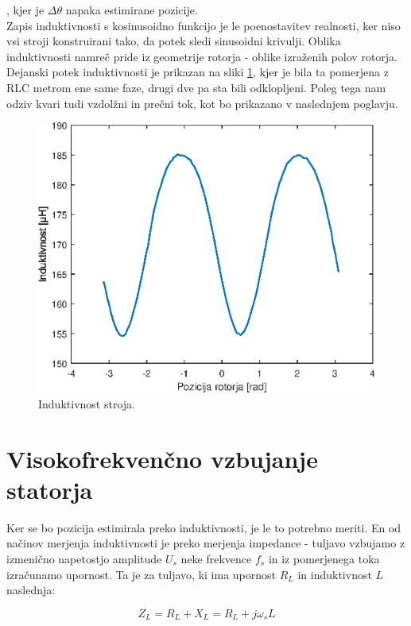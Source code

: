 \documentclass[a4paper,twoside,openright,12pt,slovene]{book}
\begin{document}
, kjer je $\Delta\theta$ napaka estimirane pozicije.
\\
Zapis induktivnosti s kosinusoidno funkcijo je le poenostavitev realnosti, ker niso vsi stroji konstruirani tako, da potek sledi sinusoidni krivulji. Oblika induktivnosti namreč pride iz geometrije
rotorja - oblike izraženih polov rotorja. Dejanski potek induktivnosti je prikazan na sliki \ref{induktivnostStroja}, kjer je bila ta pomerjena z RLC metrom ene same faze, drugi dve pa sta bili
odklopljeni. Poleg tega nam odziv kvari tudi vzdolžni in prečni tok, kot bo prikazano v naslednjem poglavju.

\begin{figure}[!htbp]
    \centering
    \includegraphics[width=0.95\columnwidth]{Slike/induktivnostStroja.eps}
    \caption{\label{induktivnostStroja} Induktivnost stroja. }
\end{figure}

\section{Visokofrekvenčno vzbujanje statorja}
Ker se bo pozicija estimirala preko induktivnosti, je le to potrebno meriti. En od načinov merjenja induktivnosti je preko merjenja impedance - tuljavo vzbujamo z izmenično napetostjo amplitude $U_s$
neke frekvence $f_s$ in iz pomerjenega toka izračunamo upornost. Ta je za tuljavo, ki ima upornost $R_L$ in induktivnost $L$ naslednja:

\begin{equation}
    Z_L = R_L + X_L = R_L + j\omega_sL
\end{equation}
\end{document}
